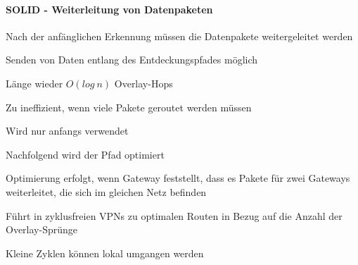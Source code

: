 \documentclass[a4paper]{article}
\begin{document}
\begin{multicols}{3}
\begin{itemize*}
            \paragraph{SOLID - Weiterleitung von
                  Datenpaketen}
            \begin{itemize*}
                  \item Nach der anfänglichen Erkennung müssen die Datenpakete weitergeleitet
                  werden
                  \item Senden von Daten entlang des Entdeckungspfades möglich
                  \begin{itemize*}
                        \item Länge wieder $O(log\ n)$ Overlay-Hops
                        \item Zu ineffizient, wenn viele Pakete geroutet werden müssen
                        \item Wird nur anfangs verwendet
                  \end{itemize*}
                  \item Nachfolgend wird der Pfad optimiert
                  \begin{itemize*}
                        \item Optimierung erfolgt, wenn Gateway feststellt, dass es Pakete für zwei Gateways weiterleitet, die sich im gleichen Netz befinden
                        \item Führt in zyklusfreien VPNs zu optimalen Routen in Bezug auf die Anzahl der Overlay-Sprünge
                        \item Kleine Zyklen können lokal umgangen werden
                  \end{itemize*}
            \end{itemize*}


\end{itemize*}
\end{multicols}
\end{document}
